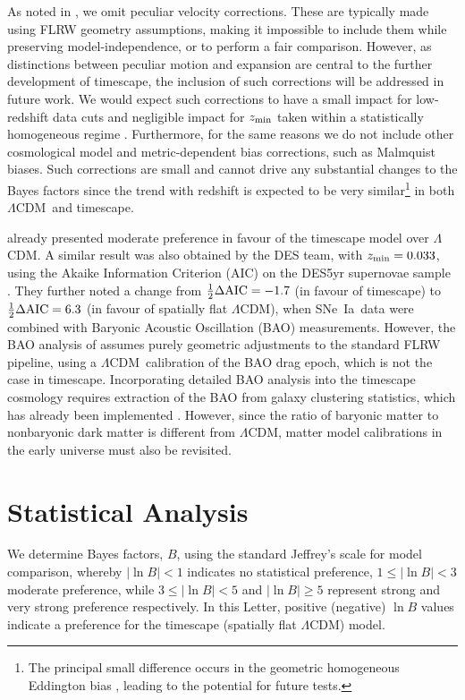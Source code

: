\documentclass[fleqn,usenatbib]{mnras}
\newcommand{\LA}{\Lambda}
\newcommand{\LCDM}{$\LA$CDM}
\newcommand{\lcdm}{spatially flat $\LA$CDM}
\newcommand{\sne}{SNe~Ia}
\newcommand{\ns}[1]{_{\rm #1}}
\newcommand{\zmin}{z\ns{min}}
\begin{document}
As noted in \citet{Lane_2023}, we omit peculiar velocity corrections. These are typically made using FLRW geometry assumptions, making it impossible to include them while preserving model-independence, or to perform a fair comparison. However, as distinctions between peculiar motion and expansion are central to the further development of timescape, the inclusion of such corrections will be addressed in future work. We would expect such corrections to have a small impact for low-redshift data cuts and negligible impact for $\zmin$ taken within a statistically homogeneous regime \citep{Carr_2022}. Furthermore, for the same reasons we do not include other cosmological model and metric-dependent bias corrections, such as Malmquist biases. Such corrections are small and cannot drive any substantial changes to the Bayes factors since the trend with redshift is expected to be very similar\footnote{The principal small difference occurs in the geometric homogeneous Eddington bias \citep{McKay_thesis_2016}, leading to the potential for future tests.} in both \LCDM\ and timescape.

\citet{Lane_2023} already presented moderate preference in favour of the timescape model over \LCDM. A similar result was also obtained by the DES team, with $\zmin=0.033$, using the Akaike Information Criterion (AIC) on the DES5yr supernovae sample \citep{Camilleri_2024}. They further noted a change from $\frac{1}{2}\Delta {\rm AIC} = -1.7$ (in favour of timescape) to $\frac{1}{2}\Delta {\rm AIC} = 6.3$ (in favour of \lcdm), when \sne \, data were combined with Baryonic Acoustic Oscillation (BAO) measurements. 
However, the BAO analysis of \citet{Camilleri_2024} assumes purely geometric adjustments to the standard FLRW pipeline, using a \LCDM\ calibration of the BAO drag epoch, which is not the case in timescape. Incorporating detailed BAO analysis into the timescape cosmology requires extraction of the BAO from galaxy clustering statistics, which has already been implemented \citep{Heinesen_2019}. However, since the ratio of baryonic matter to nonbaryonic dark matter is different from \LCDM, matter model calibrations in the early universe must also be revisited.

\section{Statistical Analysis}\label{sec:statmethods}

We determine Bayes factors, $B$, using the standard Jeffrey's scale \citep{Kass_1995} for model comparison, whereby $| \ln{B} | < 1$ indicates no statistical preference, $1 \leq | \ln{B} | < 3$ moderate preference, while $3 \leq | \ln{B} | < 5$ and $| \ln{B} | \geq 5$ represent strong and very strong preference respectively. In this Letter, positive (negative) $\ln B$ values indicate a preference for the timescape (\lcdm) model.
\end{document}
